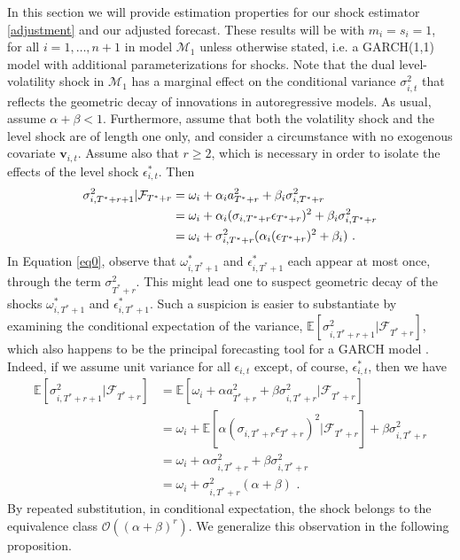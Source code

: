 \documentclass[11pt,3p,review,authoryear]{elsarticle}
\newcommand{\x}{\textbf{v}}
\def\mc#1{\mathcal{#1}} %
\def\mc#1{\mathcal{#1}}
\theoremstyle{definition}
\begin{document}
In this section we will provide estimation properties for our shock  estimator \eqref{adjustment} and our adjusted forecast. These results will be with $m_i = s_i = 1$, for all $i = 1,\ldots,n+1$ in model $\mc{M}_1$ unless otherwise stated, i.e. a GARCH(1,1) model with additional parameterizations for shocks. Note that the dual level-volatility shock in $\mc{M}_1$ has a marginal effect on the conditional variance $\sigma^{2}_{i,t}$ that reflects the geometric decay of innovations in autoregressive models.  As usual, assume $\alpha+\beta < 1$.  Furthermore, assume that both the volatility shock and the level shock are of length one only, and consider a circumstance with no exogenous covariate $\x_{i,t}$. Assume also that $r\geq 2$, which is necessary in order to isolate the effects of the level shock $\epsilon^{*}_{i,t}$.  Then
\begin{align}
\sigma^{2}_{i,T^{*}+r+1} | \mathcal{F}_{T^{*}+r} & = \omega_{i} + \alpha_{i} a_{T^{*}+r}^{2} + \beta_{i}\sigma^{2}_{i,T^{*}+r} \label{eq0}\\
& = \omega_{i} + \alpha_{i}(\sigma_{i,T^{*}+r}\epsilon_{T^{*}+r})^{2} + \beta_{i}\sigma^{2}_{i,T^{*}+r}\notag \\
& = \omega_{i} + \sigma^{2}_{i,T^{*}+r}(\alpha_{i} (\epsilon_{T^{*}+r})^{2} + \beta_{i}) \text{ .}\notag 
\end{align}
In Equation \eqref{eq0}, observe that $\omega_{i,T^{*}+1}^{*}$ and $\epsilon^{*}_{i,T^{*}+1}$ each appear at most once, through the term $\sigma^{2}_{T^{*}+r}$.  This might lead one to suspect  geometric decay of the shocks $\omega_{i,T^{*}+1}^{*}$ and $\epsilon^{*}_{i,T^{*}+1}$.  Such a suspicion is easier to substantiate by examining the conditional expectation of the variance, $\mathbb{E}[ \sigma^{2}_{i,T^{*}+r+1} |\mathcal{F}_{T^{*}+r}]$, which also happens to be the principal forecasting tool for a GARCH model \citep{zivot2009practical}.  Indeed, if we assume unit variance for all $\epsilon_{i,t}$ except, of course, $\epsilon^{*}_{i,t}$, then we have
\begin{align*}
\mathbb{E}[ \sigma^{2}_{i,T^{*}+r+1} |\mathcal{F}_{T^{*}+r}] & = \mathbb{E}[\omega_{i} + \alpha a_{T^{*}+r}^{2} + \beta\sigma^{2}_{i,T^{*}+r} |\mathcal{F}_{T^{*}+r}] \\
& = \omega_{i} + \mathbb{E}[\alpha(\sigma_{i,T^{*}+r}\epsilon_{T^{*}+r})^{2} |\mathcal{F}_{T^{*}+r}] + \beta\sigma^{2}_{i,T^{*}+r} \\
& = \omega_{i} + \alpha\sigma_{i,T^{*}+r}^{2} + \beta\sigma^{2}_{i,T^{*}+r} \tag{Due to the unit variance assumption}\\
& = \omega_{i} + \sigma^{2}_{i,T^{*}+r}(\alpha + \beta) \text{ .} 
\end{align*}
By repeated substitution, in conditional expectation, the shock belongs to the equivalence class $\mathcal{O}((\alpha+\beta)^{r})$.  We generalize this observation in the following proposition.
\end{document}
